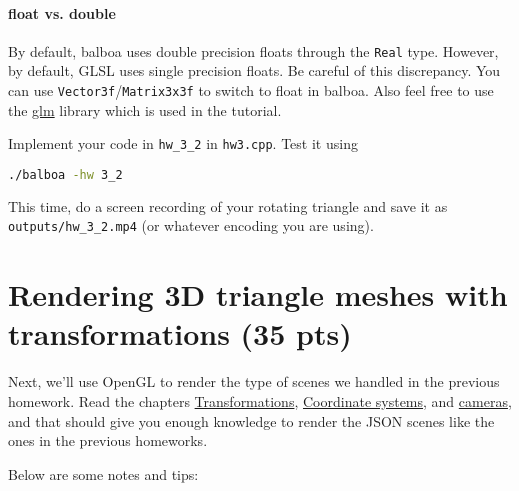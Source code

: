 \paragraph{float vs. double} By default, balboa uses double precision floats through the \lstinline{Real} type. However, by default, GLSL uses single precision floats. Be careful of this discrepancy. You can use \lstinline{Vector3f}/\lstinline{Matrix3x3f} to switch to float in balboa. Also feel free to use the \href{https://github.com/g-truc/glm}{glm} library which is used in the tutorial.

Implement your code in \lstinline{hw_3_2} in \lstinline{hw3.cpp}. Test it using
\begin{lstlisting}[language=bash]
./balboa -hw 3_2
\end{lstlisting}

This time, do a screen recording of your rotating triangle and save it as \lstinline{outputs/hw_3_2.mp4} (or whatever encoding you are using).

\section{Rendering 3D triangle meshes with transformations (35 pts)}

Next, we'll use OpenGL to render the type of scenes we handled in the previous homework. Read the chapters \href{https://learnopengl.com/Getting-started/Transformations}{Transformations}, \href{https://learnopengl.com/Getting-started/Coordinate-Systems}{Coordinate systems}, and \href{https://learnopengl.com/Getting-started/Camera}{cameras}, and that should give you enough knowledge to render the JSON scenes like the ones in the previous homeworks. 

Below are some notes and tips:

